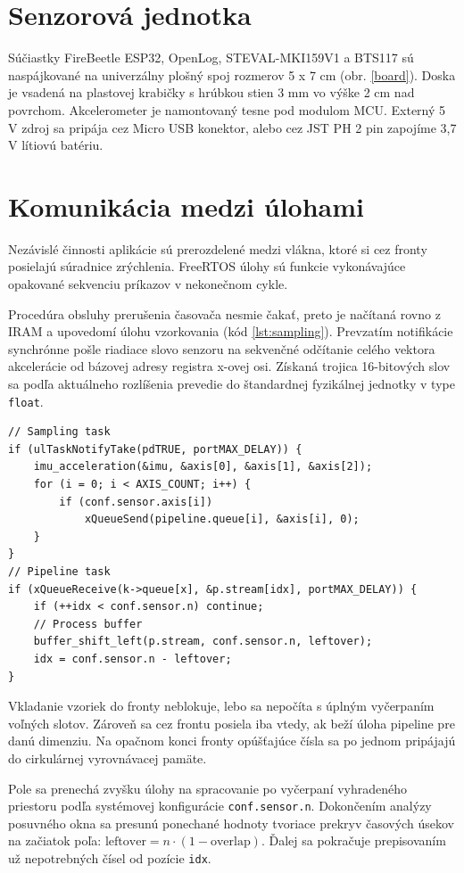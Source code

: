 \section{Senzorová jednotka}
Súčiastky FireBeetle ESP32, OpenLog, STEVAL-MKI159V1 a BTS117 sú naspájkované na univerzálny plošný spoj rozmerov 5 x 7 cm 
(obr. \ref{board}). Doska je vsadená na plastovej krabičky s hrúbkou stien 3 mm vo výške 2 cm nad povrchom. Akcelerometer je namontovaný 
tesne pod modulom MCU. Externý 5 V zdroj sa pripája cez Micro USB konektor, alebo cez JST PH 2 pin zapojíme 3,7 V lítiovú batériu.

\section{Komunikácia medzi úlohami}
Nezávislé činnosti aplikácie sú prerozdelené medzi vlákna, ktoré si cez fronty posielajú súradnice zrýchlenia.
FreeRTOS úlohy sú funkcie vykonávajúce opakované sekvenciu príkazov v nekonečnom cykle. 

Procedúra obsluhy prerušenia časovača nesmie čakať, preto je načítaná rovno z IRAM a upovedomí úlohu vzorkovania (kód \ref{lst:sampling}). 
Prevzatím notifikácie synchrónne pošle riadiace slovo senzoru na sekvenčné odčítanie celého vektora akcelerácie od bázovej adresy
registra x-ovej osi. Získaná trojica 16-bitových slov sa podľa aktuálneho rozlíšenia prevedie do štandardnej fyzikálnej jednotky
v type \verb|float|.

\begin{lstlisting}[style=cstyle,caption=Posielanie vzoriek medzi úlohami cez fronty,label={lst:sampling},
 morekeywords={ulTaskNotifyTake,xQueueSend,xQueueReceive}]
// Sampling task
if (ulTaskNotifyTake(pdTRUE, portMAX_DELAY)) {
	imu_acceleration(&imu, &axis[0], &axis[1], &axis[2]);
	for (i = 0; i < AXIS_COUNT; i++) {
    	if (conf.sensor.axis[i])  
        	xQueueSend(pipeline.queue[i], &axis[i], 0);
    }
}
// Pipeline task
if (xQueueReceive(k->queue[x], &p.stream[idx], portMAX_DELAY)) {
	if (++idx < conf.sensor.n) continue;
    // Process buffer
    buffer_shift_left(p.stream, conf.sensor.n, leftover);
    idx = conf.sensor.n - leftover;
}
\end{lstlisting}
Vkladanie vzoriek do fronty neblokuje, lebo sa nepočíta s úplným vyčerpaním voľných slotov. Zároveň
sa cez frontu posiela iba vtedy, ak beží úloha pipeline pre danú dimenziu. Na opačnom konci fronty opúšťajúce čísla 
sa po jednom pripájajú do cirkulárnej vyrovnávacej pamäte. 

Pole sa prenechá zvyšku úlohy na spracovanie po vyčerpaní vyhradeného priestoru podľa
systémovej konfigurácie \verb|conf.sensor.n|. Dokončením analýzy posuvného okna sa presunú ponechané hodnoty tvoriace prekryv časových 
úsekov na začiatok poľa: $\mathrm{leftover} = n \cdot (1 - \mathrm{overlap})$. 
Ďalej sa pokračuje prepisovaním už nepotrebných čísel od pozície \verb|idx|.

